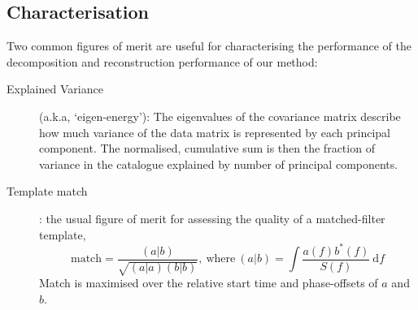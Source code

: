\documentclass[a0,landscape]{a0poster}
\newcommand{\diff}{{\mathrm d}}
\begin{document}
\begin{multicols}{4}
\section*{\centering Characterisation}
Two common figures of merit are useful for characterising the performance of the
decomposition and reconstruction performance of our method:
\begin{description}
    \item [Explained Variance] (a.k.a, `eigen-energy'): The eigenvalues of the
        covariance matrix describe how much variance of the data matrix is
        represented by each principal component.  The normalised, cumulative sum
        is then the fraction of variance in the catalogue explained by number of
        principal components.
    \item [Template match]: the usual figure of merit for assessing the quality
        of a matched-filter template,
        \begin{equation}
            \text{match} = \frac{(a|b)}{\sqrt{(a|a) (b|b)}},~\text{where}~
            (a|b) = \int \frac{a(f)b^*(f)}{S(f)}~\diff f
        \end{equation}
        Match is maximised over the relative start time and phase-offsets of $a$
        and $b$.
\end{description}

\begin{comment}
%
%
\begin{center}%
    \texttt{[image: eigenergy.pdf]}
    \captionof{figure}{ Explained Variance.}
    \label{fig:eigenergy}
\end{center}%

Figure~\ref{fig:eigenergy} compares the explained variance as a function of
number of principal components for the original and shifted spectra.  We require
about half as many principal components after applying our shifting procedure.
Much of the variance in the original catalogue arises from a feature, the
location of $f_{\rm peak}$, which is easily aligned.
\end{comment}



\end{multicols}
\end{document}
